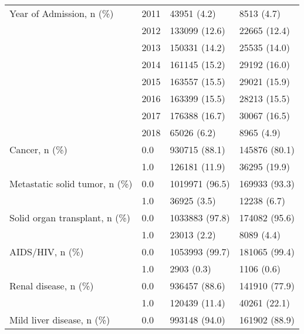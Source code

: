 \begin{tabular}{llll}
Year of Admission, n (\%) & 2011 &                    43951 (4.2) &         8513 (4.7) \\
                                       & 2012 &                  133099 (12.6) &       22665 (12.4) \\
                                       & 2013 &                  150331 (14.2) &       25535 (14.0) \\
                                       & 2014 &                  161145 (15.2) &       29192 (16.0) \\
                                       & 2015 &                  163557 (15.5) &       29021 (15.9) \\
                                       & 2016 &                  163399 (15.5) &       28213 (15.5) \\
                                       & 2017 &                  176388 (16.7) &       30067 (16.5) \\
                                       & 2018 &                    65026 (6.2) &         8965 (4.9) \\
Cancer, n (\%) & 0.0 &                  930715 (88.1) &      145876 (80.1) \\
                                       & 1.0 &                  126181 (11.9) &       36295 (19.9) \\
Metastatic solid tumor, n (\%) & 0.0 &                 1019971 (96.5) &      169933 (93.3) \\
                                       & 1.0 &                    36925 (3.5) &        12238 (6.7) \\
Solid organ transplant, n (\%) & 0.0 &                 1033883 (97.8) &      174082 (95.6) \\
                                       & 1.0 &                    23013 (2.2) &         8089 (4.4) \\
AIDS/HIV, n (\%) & 0.0 &                 1053993 (99.7) &      181065 (99.4) \\
                                       & 1.0 &                     2903 (0.3) &         1106 (0.6) \\
Renal disease, n (\%) & 0.0 &                  936457 (88.6) &      141910 (77.9) \\
                                       & 1.0 &                  120439 (11.4) &       40261 (22.1) \\
Mild liver disease, n (\%) & 0.0 &                  993148 (94.0) &      161902 (88.9) \\

\end{tabular}
